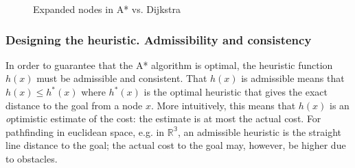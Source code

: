 \begin{figure}[ht]
\centering
{}
\qquad
{}
\caption{Expanded nodes in A* vs. Dijkstra}
\label{fig:astar_vs_dijkstra}
\end{figure}

\subsubsection{Designing the heuristic. Admissibility and consistency}
In order to guarantee that the A* algorithm is optimal, the heuristic function $h(x)$ must be admissible and consistent\cite{astar}. That $h(x)$ is admissible means that $h(x) \leq h^*(x)$ where $h^*(x)$ is the optimal heuristic that gives the exact distance to the goal from a node $x$. More intuitively, this means that $h(x)$ is an {\textit optimistic} estimate of the cost: the estimate is at most the actual cost. For pathfinding in euclidean space, e.g. in $\mathbb{R^3}$, an admissible heuristic is the straight line distance to the goal; the actual cost to the goal may, however, be higher due to obstacles.

